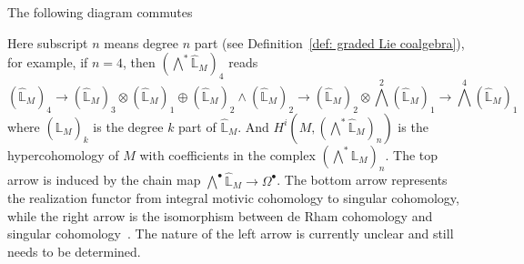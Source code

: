 \begin{conjecture}
The following diagram commutes
\begin{center}
\end{center}
Here subscript $n$ means degree $n$ part (see Definition~\ref{def: graded Lie coalgebra}), for example, if $n=4$, then $(\bigwedge^*\widehat{\mathbb L}_M)_4$ reads
\[
(\widehat{\mathbb L}_M)_4\to(\widehat{\mathbb L}_M)_3\otimes(\widehat{\mathbb L}_M)_1\oplus(\widehat{\mathbb L}_M)_2\wedge(\widehat{\mathbb L}_M)_2\to(\widehat{\mathbb L}_M)_2\otimes\textstyle\bigwedge^2(\widehat{\mathbb L}_M)_1\to\textstyle\bigwedge^4(\widehat{\mathbb L}_M)_1
\]
where $(\widehat{\mathbb L}_M)_k$ is the degree $k$ part of $\widehat{\mathbb L}_M$. And $H^i(M,(\bigwedge^*\widehat{\mathbb L}_M)_n)$ is the hypercohomology of $M$ with coefficients in the complex $(\bigwedge^*\widehat{\mathbb L}_M)_n$. The top arrow is induced by the chain map $\bigwedge^\bullet\widehat{\mathbb L}_M\to\Omega^\bullet$. The bottom arrow represents the realization functor from integral motivic cohomology to singular cohomology, while the right arrow is the isomorphism between de Rham cohomology and singular cohomology~\cite{Grothendieck_OnTheDeRhamCohomologyOfAlgebraicVarieties}. The nature of the left arrow is currently unclear and still needs to be determined.
\end{conjecture}


